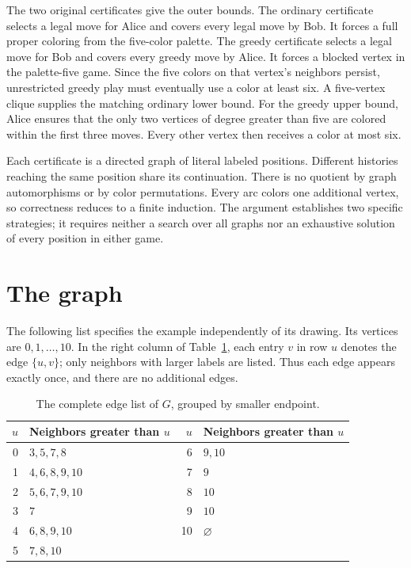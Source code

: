 \documentclass[11pt]{article}
\begin{document}
The two original certificates give the outer bounds. The ordinary certificate selects a legal move
for Alice and covers every legal move by Bob. It forces a full proper
coloring from the five-color palette. The greedy certificate selects a
legal move for Bob and covers every greedy move by Alice. It forces a
blocked vertex in the palette-five game. Since the five colors on that
vertex's neighbors persist, unrestricted greedy play must eventually
use a color at least six. A five-vertex clique supplies the matching
ordinary lower bound. For the greedy upper bound, Alice ensures that the
only two vertices of degree greater than five are colored within the
first three moves.
Every other vertex then receives a color at most six.

Each certificate is a directed graph of literal labeled positions.
Different histories reaching the same position share its continuation.
There is no quotient by graph automorphisms or by color permutations.
Every arc colors one additional vertex, so correctness reduces to a
finite induction. The argument establishes two specific strategies; it
requires neither a search over all graphs nor an exhaustive solution of
every position in either game.

\section{The graph}\label{sec:graph}
The following list specifies the example independently of its drawing.
Its vertices are $0,1,\ldots,10$. In the right column of
Table~\ref{tab:edges}, each entry $v$ in row $u$ denotes the edge
$\{u,v\}$; only neighbors with larger labels are listed. Thus each edge
appears exactly once, and there are no additional edges.

\begin{table}[ht]
\centering
\begin{tabular}{r@{\qquad}l r@{\qquad}l}
\toprule
$u$ & Neighbors greater than $u$ & $u$ & Neighbors greater than $u$\\
\midrule
0 & $3,5,7,8$       & 6 & $9,10$\\
1 & $4,6,8,9,10$    & 7 & $9$\\
2 & $5,6,7,9,10$    & 8 & $10$\\
3 & $7$            & 9 & $10$\\
4 & $6,8,9,10$     &10 & $\varnothing$\\
5 & $7,8,10$       &   & \\
\bottomrule
\end{tabular}
\caption{The complete edge list of $G$, grouped by smaller endpoint.}
\label{tab:edges}
\end{table}
\end{document}
